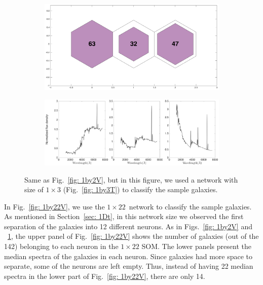             \begin{figure}
                \begin{subfigure}[b]{0.5\textwidth}
                    \centering
                    \includegraphics[width=\textwidth]{images0.01/1d/hit_v_1_by_3.png}
                \end{subfigure}
                \hfill
                \begin{subfigure}[b]{0.5\textwidth}
                     \includegraphics[width=\textwidth]{images0.01/1d/SED_total1by3_fluxdensity.png}
                \end{subfigure}
                \caption[Classification of fitted galaxy SEDs from \citet{Hossein12} using the $1\times3$~networks]{Same as Fig.~\ref{fig: 1by2V}, but in this figure, we used a network with size of $1\times3$ (Fig.~\ref{fig: 1by3T}) to classify the sample galaxies.}
                \label{fig: 1by3V}
            \end{figure}       
            
            In Fig.~\ref{fig: 1by22V}, we use the $1\times22$~network to classify the sample galaxies.
            As mentioned in Section~\ref{sec: 1Dt}, in this network size we observed the first separation of the  galaxies into 12 different neurons.
            As in Figs.~\ref{fig: 1by2V} and ~\ref{fig: 1by3V}, the upper panel of Fig.~\ref{fig: 1by22V} shows the number of galaxies (out of the 142) belonging to each neuron in the $1\times22$ SOM.
            The lower panels present the median spectra of the galaxies in each neuron.
            Since galaxies had more space to separate, some of the neurons are left empty.
            Thus, instead of having 22 median spectra in the lower part of Fig.~\ref{fig: 1by22V}, there are only 14.

